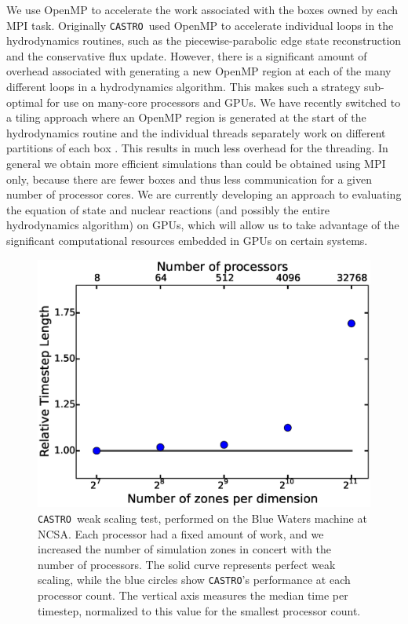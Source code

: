 \documentclass[iop]{../emulateapj}
\newcommand{\castro}{\texttt{CASTRO}}
\begin{document}
We use OpenMP to accelerate the work associated with the boxes owned
by each MPI task. Originally \castro\ used OpenMP to accelerate
individual loops in the hydrodynamics routines, such as the
piecewise-parabolic edge state reconstruction and the conservative
flux update. However, there is a significant amount of overhead
associated with generating a new OpenMP region at each of the many
different loops in a hydrodynamics algorithm. This makes such a
strategy sub-optimal for use on many-core processors and GPUs. We have
recently switched to a tiling approach where an OpenMP region is
generated at the start of the hydrodynamics routine and the individual
threads separately work on different partitions of each box \citep{boxlib-tiling}. This
results in much less overhead for the threading. In general we obtain
more efficient simulations than could be obtained using MPI only,
because there are fewer boxes and thus less communication for a given
number of processor cores. We are currently developing an approach to
evaluating the equation of state and nuclear reactions (and possibly
the entire hydrodynamics algorithm) on GPUs, which will allow us to
take advantage of the significant computational resources embedded in
GPUs on certain systems.

\begin{figure}
  \centering
  \includegraphics[scale=0.4]{plots/weak_scaling}
  \caption{\castro\ weak scaling test, performed on the Blue Waters machine at 
    NCSA. Each processor had a fixed amount of work, and we increased the 
    number of simulation zones in concert with the number of processors. The 
    solid curve represents perfect weak scaling, while the blue circles show 
    \castro's performance at each processor count. The vertical axis measures 
    the median time per timestep, normalized to this value for the smallest 
    processor count.\label{fig:weak_scaling}}
\end{figure}
\end{document}
